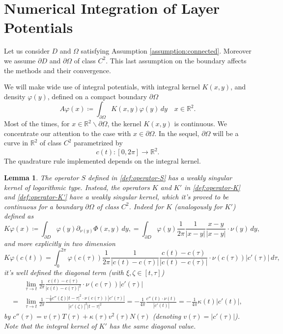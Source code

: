 \documentclass[10pt, a4paper, twoside, openright]{book}
\theoremstyle{definition}
\theoremstyle{plain}
\theoremstyle{plain}
\theoremstyle{plain}
\theoremstyle{plain}
\theoremstyle{plain}
\newtheorem{lemma}[subsection]{Lemma}
\theoremstyle{plain}
\theoremstyle{plain}
\theoremstyle{plain}
\let\phi\varphi
\begin{document}
\section{Numerical Integration of Layer Potentials}
Let us consider $D$ and $\Omega$
satisfying Assumption \ref{assumption:connected}. 
Moreover we assume $\partial D$ and $\partial \Omega$ of class $C^2$.
This last assumption on the boundary affects the methods and their convergence.
\par
We will make wide use of integral potentials, with integral kernel $K(x,y)$, and density $\phi(y)$, defined on a compact boundary $\partial \Omega$
\begin{equation}
\label{eq:quad-def-operator}
 A\phi(x)\coloneqq \int_{\partial \Omega} K(x,y)\phi(y)\,dy \quad x\in\mathbb{R}^2.
\end{equation}
Most of the times, for $x\in\mathbb{R}^2\backslash\partial \Omega$, the kernel $K(x,y)$ is 
continuous. We concentrate our 
attention to the case with $x\in\partial\Omega$.
In the sequel, $\partial\Omega$ will be a curve in $\mathbb{R}^2$ of class $C^2$ parametrized by
\begin{equation}
c(t):[0,2\pi]\to\mathbb{R}^2.
\end{equation}
The quadrature rule implemented depends on the integral kernel. 
\begin{lemma}
The operator $S$ defined in \eqref{def:operator-S} has a weakly singular kernel of logarithmic type. 
Instead, the operators $K$ and $K'$ in 
\eqref{def:operator-K} and \eqref{def:operator-K'} have a weakly singular kernel, which it's proved to 
be continuous for a boundary $\partial \Omega$ of class $C^2$. Indeed for $K$ (analogously for $K'$) defined as
\begin{equation*}
K\phi(x)\coloneqq\int_{\partial D} \phi(y) \partial_{\nu(y)} \Phi(x, y) \,dy,
=\int_{\partial D} \phi(y)\frac{1}{2\pi}\frac{1}{|x - y|}\frac{x-y}{|x-y|}\cdot\nu(y)\, dy,
\end{equation*}
and more explicitly in two dimension
\begin{equation}
K\phi(c(t)) =\int_0^{2\pi} \phi(c(\tau))\frac{1}{2\pi}\frac{1}{|c(t) - c(\tau)|}\frac{c(t)-c(\tau)}{|c(t) - c(\tau)|}\cdot\nu(c(\tau))|c'(\tau)|\, d\tau,
\end{equation}
it's well defined the diagonal term (with $\xi,\zeta \in [t,\tau]$)
\begin{align}
 &\lim_{\tau \to t}\frac{1}{2\pi}\frac{c(t)-c(\tau)}{|c(t) - c(\tau)|^2}\cdot\nu(c(\tau))|c'(\tau)| \\
 =&\lim_{\tau \to t}\frac{1}{2\pi}\frac{-\frac{1}{2}c''(\xi)|t-\tau|^2\cdot\nu(c(\tau))|c'(\tau)|}{|c'(\zeta)|^2|t-\tau|^2}
 = -\frac{1}{4\pi}\frac{c''(t)\cdot\nu(t)}{|c'(t)|} = -\frac{1}{4\pi}\kappa(t)|c'(t)|,
\end{align}
by $c''(\tau)=v(\tau)T(\tau) + \kappa(\tau)v^2(\tau)N(\tau)$ (denoting $v(\tau)=|c'(\tau)|$). Note that the integral kernel of $K'$ has the same diagonal value.
\end{lemma}
\end{document}
